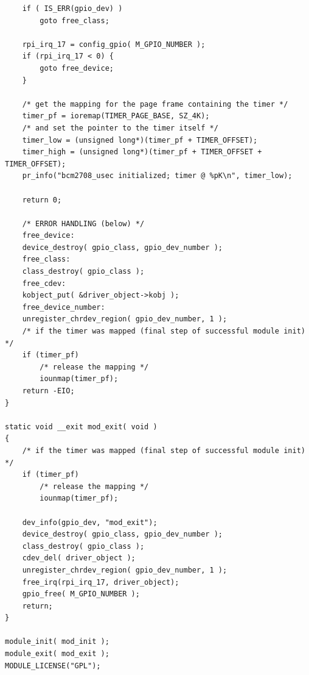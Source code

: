 \begin{lstlisting}
	if ( IS_ERR(gpio_dev) )
		goto free_class;

	rpi_irq_17 = config_gpio( M_GPIO_NUMBER );
	if (rpi_irq_17 < 0) {
		goto free_device;
	}

	/* get the mapping for the page frame containing the timer */
	timer_pf = ioremap(TIMER_PAGE_BASE, SZ_4K);
	/* and set the pointer to the timer itself */
	timer_low = (unsigned long*)(timer_pf + TIMER_OFFSET);
	timer_high = (unsigned long*)(timer_pf + TIMER_OFFSET + TIMER_OFFSET);
	pr_info("bcm2708_usec initialized; timer @ %pK\n", timer_low);

	return 0;

	/* ERROR HANDLING (below) */
	free_device:
	device_destroy( gpio_class, gpio_dev_number );
	free_class:
	class_destroy( gpio_class );
	free_cdev:
	kobject_put( &driver_object->kobj );
	free_device_number:
	unregister_chrdev_region( gpio_dev_number, 1 );
	/* if the timer was mapped (final step of successful module init) */
	if (timer_pf)
		/* release the mapping */
		iounmap(timer_pf);
	return -EIO;
}

static void __exit mod_exit( void )
{
	/* if the timer was mapped (final step of successful module init) */
	if (timer_pf)
		/* release the mapping */
		iounmap(timer_pf);

	dev_info(gpio_dev, "mod_exit");
	device_destroy( gpio_class, gpio_dev_number );
	class_destroy( gpio_class );
	cdev_del( driver_object );
	unregister_chrdev_region( gpio_dev_number, 1 );
	free_irq(rpi_irq_17, driver_object);
	gpio_free( M_GPIO_NUMBER );
	return;
}

module_init( mod_init );
module_exit( mod_exit );
MODULE_LICENSE("GPL");
\end{lstlisting}

